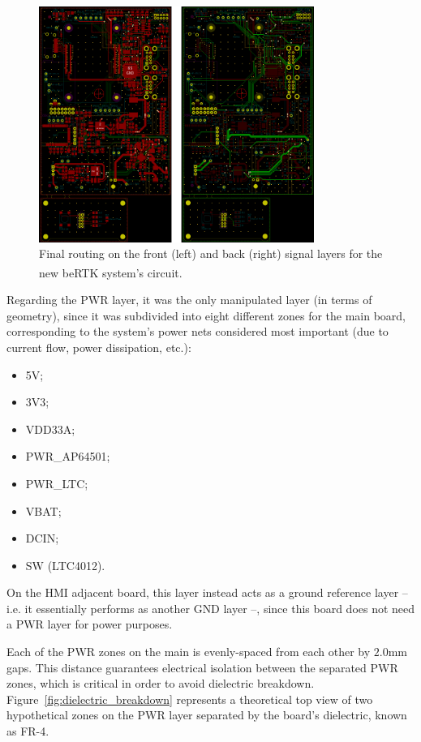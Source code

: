 \begin{figure}[h]
	\centering
	\includegraphics[width=0.8\textwidth]{Chapters/Figures/chapter5/7_routing_FULL_FCu_BCu.png}
	\caption{Final routing on the front (left) and back (right) signal layers for the new beRTK\textsuperscript{\textregistered} system's circuit.}
	\label{fig:7_routing_FULL_FCu_BCu}
\end{figure}

Regarding the PWR layer, it was the only manipulated layer (in terms of geometry), since it was subdivided into eight different zones for the main board, corresponding to the system's power nets considered most important (due to current flow, power dissipation, etc.):

\begin{itemize}
	\item 5V;
	\item 3V3;
	\item VDD33A;
	\item PWR\_AP64501;
	\item PWR\_LTC;
	\item VBAT;
	\item DCIN;
	\item SW (LTC4012).
\end{itemize}

On the HMI adjacent board, this layer instead acts as a ground reference layer -- i.e. it essentially performs as another GND layer --, since this board does not need a PWR layer for power purposes. 

Each of the PWR zones on the main is evenly-spaced from each other by $2.0$mm gaps. This distance guarantees electrical isolation between the separated PWR zones, which is critical in order to avoid dielectric breakdown. Figure~\ref{fig:dielectric_breakdown} represents a theoretical top view of two hypothetical zones on the PWR layer separated by the board's dielectric, known as FR-4.

